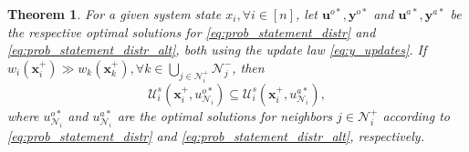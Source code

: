 \documentclass[10pt,a4paper]{amsart}
\newtheorem{theorem}{Theorem}
\begin{document}
\begin{theorem} \label{thm:alt_feasibility}
 For a given system state $x_i, \forall i \in [n]$,  let  $\mathbf{u}^{o*}, \mathbf{y}^{o*}$ and $\mathbf{u}^{a*}, \mathbf{y}^{a*}$ be the respective optimal solutions for  \eqref{eq:prob_statement_distr} and \eqref{eq:prob_statement_distr_alt}, both using the update law \eqref{eq:y_updates}.  If $w_i(\mathbf{x}_i^+) \gg w_k(\mathbf{x}_k^+), \forall k \in \bigcup_{j \in \mathcal{N}_i^+} \mathcal{N}_j^-$, then
    \begin{equation} \label{eq:thm1_set_inclusion}
        \mathcal{U}_i^s(\mathbf{x}_i^+, u_{\mathcal{N}_i}^{o*}) \subseteq \mathcal{U}_i^s(\mathbf{x}_i^+, u_{\mathcal{N}_i}^{a*}),
    \end{equation}
    where $u_{\mathcal{N}_i}^{o*}$ and $u_{\mathcal{N}_i}^{a*}$ are the optimal solutions for neighbors $j \in \mathcal{N}_i^+$ according to \eqref{eq:prob_statement_distr} and \eqref{eq:prob_statement_distr_alt}, respectively. 
\end{theorem}
\end{document}
